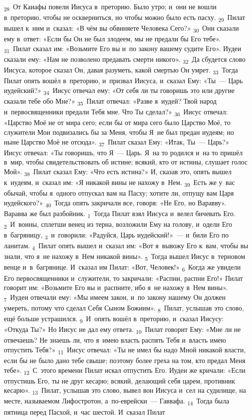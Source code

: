\documentclass[a4paper,12pt]{article}
\begin{document}
\textsubscript{28}~От Каиафы повели Иисуса в~преторию. Было утро; и~они не вошли в~преторию, чтобы не оскверниться, но чтобы можно было есть пасху. \textsubscript{29}~Пилат вышел к~ним и~сказал: «В чём вы обвиняете Человека Сего?» \textsubscript{30}~Они сказали ему в~ответ: «Если бы Он не был злодеем, мы не предали бы Его тебе». \textsubscript{31}~Пилат сказал им: «Возьмите Его вы и~по закону вашему судите Его». Иудеи сказали ему: «Нам не позволено предавать смерти никого». \textsubscript{32}~Да сбудется слово Иисуса, которое сказал Он, давая разуметь, какой смертью Он умрет. \textsubscript{33}~Тогда Пилат опять вошёл в~преторию, и~призвал Иисуса, и~сказал Ему: «Ты~--- Царь иудейский?» \textsubscript{34}~Иисус отвечал ему: «От себя ли ты говоришь это или другие сказали тебе обо Мне?» \textsubscript{35}~Пилат отвечал: «Разве я~иудей? Твой народ и~первосвященники предали Тебя мне. Что Ты сделал?» \textsubscript{36}~Иисус отвечал: «Царство Моё не от мира сего; если бы от мира сего было Царство Моё, то служители Мои подвизались бы за Меня, чтобы Я~не был предан иудеям; но ныне Царство Моё не отсюда». \textsubscript{37}~Пилат сказал Ему: «Итак, Ты~--- Царь?» Иисус отвечал: «Ты говоришь, что Я~— Царь. Я~на то родился и~на то пришёл в~мир, чтобы свидетельствовать об истине; всякий, кто от истины, слушает голос Мой». \textsubscript{38}~Пилат сказал Ему: «Что есть истина?» И, сказав это, опять вышел к~иудеям, и~сказал им: «Я никакой вины не нахожу в~Нем. \textsubscript{39}~Есть же у~вас обычай, чтобы я~одного отпускал вам на Пасху; хотите ли, отпущу вам Царя иудейского?» \textsubscript{40}~Тогда опять закричали все, говоря: «Не Его, но Варавву». Варавва же был разбойник. \textsubscript{1}~Тогда Пилат взял Иисуса и~велел бичевать Его. \textsubscript{2}~И~воины, сплетши венец из терна, возложили Ему на голову, и~одели Его в~багряницу, \textsubscript{3}~и~говорили: «Радуйся, Царь иудейский!»~--- и~били Его по ланитам. \textsubscript{4}~Пилат опять вышел и~сказал им: «Вот я~вывожу Его к~вам, чтобы вы знали, что я~не нахожу в~Нем никакой вины». \textsubscript{5}~Тогда вышел Иисус в~терновом венце и~в~багрянице. И~сказал им Пилат: «Вот, Человек!» \textsubscript{6}~Когда же увидели Его первосвященники и~служители, то закричали: «Распни, распни Его!» Пилат говорит им: «Возьмите Его вы и~распните, ибо я~не нахожу в~Нем вины». \textsubscript{7}~Иудеи отвечали ему: «Мы имеем закон, и~по закону нашему Он должен умереть, потому что сделал Себя Сыном Божиим». \textsubscript{8}~Пилат, услышав это слово, ещё больше устрашился. \textsubscript{9}~И~опять вошёл в~преторию, и~сказал Иисусу: «Откуда Ты?» Но Иисус не дал ему ответа. \textsubscript{10}~Пилат говорит Ему: «Мне ли не отвечаешь? Не знаешь ли, что я~имею власть распять Тебя и~власть имею отпустить Тебя?» \textsubscript{11}~Иисус отвечал: «Ты не имел бы надо Мной никакой власти, если бы не было дано тебе свыше; поэтому более греха на том, кто предал Меня тебе». \textsubscript{12}~С~этого времени Пилат искал отпустить Его. Иудеи же кричали: «Если отпустишь Его, ты не друг кесарю; всякий, делающий себя царем, противник кесарю». \textsubscript{13}~Пилат, услышав это слово, вывел вон Иисуса и~сел на судилище, на месте, называемом Лифостротон, а~по-еврейски~--- Гаввафа. \textsubscript{14}~Тогда была пятница перед Пасхой, и~час шестой. И~сказал Пилат 
\end{document}
